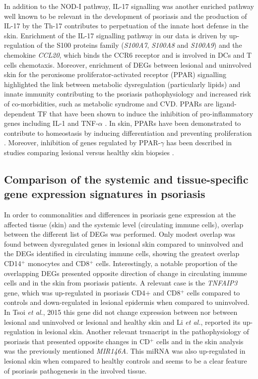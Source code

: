 In addition to the NOD-I pathway, IL-17 signalling was another enriched pathway well known to be relevant in the development of psoriasis and the production of IL-17 by the Th-17 contributes to perpetuation of the innate host defense in the skin. Enrichment of the IL-17 signalling pathway in our data is driven by up-regulation of the S100 proteins family (\textit{S100A7}, \textit{S100A8} and \textit{S100A9}) and the chemokine \textit{CCL20}, which binds the CCR6 receptor and is involved in DCs and T cells chemotaxis. Moreover, enrichment of DEGs between lesional and uninvolved skin for the peroxisome proliferator-activated receptor (PPAR) signalling highlighted the link between metabolic dysregulation (particularly lipids) and innate immunity contributing to the psoriasis pathophysiology and increased risk of co-morbidities, such as metabolic syndrome and CVD. PPARs are ligand-dependent TF that have been shown to induce the inhibition of pro-inflammatory genes including IL-1 and TNF-$\alpha$ \parencite{Ji2001}. In skin, PPARs have been demonstrated to contribute to homeostasis by inducing differentiation and preventing proliferation \parencite{Rivier1998}. Moreover, inhibition of genes regulated by PPAR-$\gamma$ has been described in studies comparing lesional versus healthy skin biopsies \parencite{Li2014}.


 

\subsection{Comparison of the systemic and tissue-specific gene expression signatures in psoriasis}
In order to commonalities and differences in psoriasis gene expression at the affected tissue (skin) and the systemic level (circulating immune cells), overlap between the different list of DEGs was performed. Only modest overlap was found between dysregulated genes in lesional skin compared to uninvolved and the DEGs identified in circulating immune cells, showing the greatest overlap CD14$^+$ monocytes and CD8$^+$ cells. Interestingly, a notable proportion of the overlapping DEGs presented opposite direction of change in circulating immune cells and in the skin from psoriasis patients. A relevant case is the \textit{TNFAIP3} gene, which was up-regulated in psoriasis CD4$+$ and CD8$^+$ cells compared to controls and down-regulated in lesional epidermis when compared to uninvolved.  In Tsoi \textit{et al.}, 2015 this gene did not change expression between nor between lesional and uninvolved or lesional and healthy skin and Li \textit{et al.}, reported its up-regulation in lesional skin. Another relevant trsnacript in the pathophysiology of psoriasis that presented opposite changes in CD$^+$ cells and in the skin analysis was the previously mentioned \textit{MIR146A}. This miRNA was also up-regulated in lesional skin when compared to healthy controls and seems to be a clear feature of psoriasis pathogenesis in the involved tissue.
 

